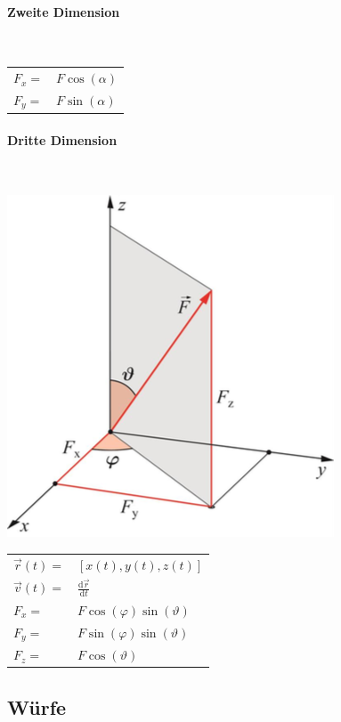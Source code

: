 \documentclass[a4paper]{scrartcl}
\begin{document}
\paragraph{Zweite Dimension} \hfill \\
	\begin{tabu} {l X}
		$F_x = $ & $F\cos(\alpha)$ \\
		$F_y = $ & $F\sin(\alpha)$ \\
	\end{tabu}

\pagebreak

\paragraph{Dritte Dimension} \hfill \\
	\begin{multicols}{2}
		\includegraphics[width=0.6\linewidth]{img/darstellungKraefte.png}
		
		\begin{tabu} {l X}
			$\vec{r}(t) =$ & $ \left[ x(t),y(t),z(t)\right]$ \\
			$\vec{v}(t) =$ & $\frac{\text{d}\vec{r}}{\text{d}t}$ \\
			$F_x = $ & $F\cos(\varphi)\sin(\vartheta)$ \\
			$F_y = $ & $F\sin(\varphi)\sin(\vartheta)$ \\
			$F_z = $ & $F\cos(\vartheta)$
		\end{tabu}
	\end{multicols}

\subsection{Würfe}
\end{document}
